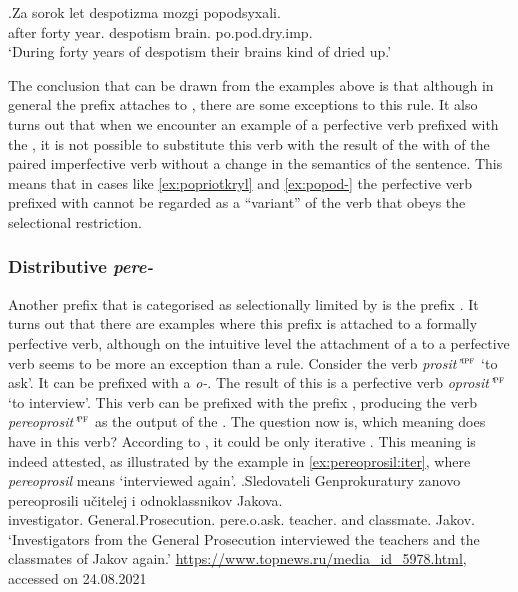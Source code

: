 \exg.\label{ex:popod-imp}Za sorok let despotizma mozgi popodsyxali.\\
after forty year. despotism brain. po.pod.dry.imp.\\
\trans `During forty years of despotism their brains kind of dried up.'

The conclusion that can be drawn from the examples above is that although in general the  prefix  attaches to , there are some exceptions to this rule. It also turns out that when we encounter an example of a perfective verb prefixed with the  , it is not possible to substitute this verb with the result of the  with  of the paired imperfective verb without a change in the semantics of the sentence. This means that in cases like \ref{ex:popriotkryl} and \ref{ex:popod-} the perfective verb prefixed with  cannot be regarded as a ``variant'' of the verb that obeys the selectional restriction.
 
\subsubsection{Distributive \textit{pere-}}\largerpage[2]
Another prefix that is categorised as selectionally limited by \citet{Tatevosov:09} is the  prefix . It turns out that there are examples where this prefix is attached to a formally perfective verb, although on the intuitive level the attachment of a   to a perfective verb seems to be more an exception than a rule. Consider the verb \textit{prosit'}$^{\textsc{ipf}}$ `to ask'. It can be prefixed with a  \textit{o-}. The result of this  is a perfective verb \textit{oprosit'}$^{\textsc{pf}}$ `to interview'. This verb can be prefixed with the prefix , producing the verb \textit{pereoprosit'}$^{\textsc{pf}}$ as the output of the . The question now is, which meaning does  have in this verb? According to \citet{Tatevosov:09}, it could be only iterative . This meaning is indeed attested, as illustrated by the example in \ref{ex:pereoprosil:iter}, where \textit{pereoprosil} means `interviewed again'.
\exg.\label{ex:pereoprosil:iter}Sledovateli Genprokuratury zanovo pereoprosili u\v{c}itelej i odnoklassnikov Jakova.\\
investigator. General.Prosecution.  pere.o.ask. teacher. and classmate. Jakov.\\
\trans `Investigators from the General Prosecution interviewed the teachers and the classmates of Jakov again.' \url{https://www.topnews.ru/media_id_5978.html}, accessed on 24.08.2021

